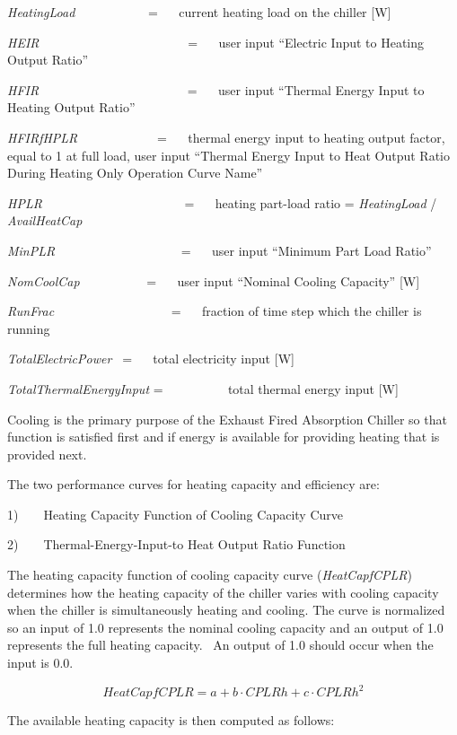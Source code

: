 \emph{HeatingLoad}~~~~~~~~~~~ = ~~ current heating load on the chiller {[}W{]}

\emph{HEIR}~~~~~~~~~~~~~~~~~~~~~~~ = ~~ user input ``Electric Input to Heating Output Ratio''

\emph{HFIR}~~~~~~~~~~~~~~~~~~~~~~~ = ~~ user input ``Thermal Energy Input to Heating Output Ratio''

\emph{HFIRfHPLR}~~~~~~~~~~~~ = ~~ thermal energy input to heating output factor, equal to 1 at full load, user input ``Thermal Energy Input to Heat Output Ratio During Heating Only Operation Curve Name''

\emph{HPLR}~~~~~~~~~~~~~~~~~~~~~~ = ~~ heating part-load ratio = \emph{HeatingLoad} / \emph{AvailHeatCap}

\emph{MinPLR~~~~~~~~~~~~~~~~~~~} = ~~ user input ``Minimum Part Load Ratio''

\emph{NomCoolCap}~~~~~~~~~~ = ~~ user input ``Nominal Cooling Capacity'' {[}W{]}

\emph{RunFrac}~~~~~~~~~~~~~~~~~~ = ~~ fraction of time step which the chiller is running

\emph{TotalElectricPower~} = ~~ total electricity input {[}W{]}

\emph{TotalThermalEnergyInput} = ~~~~~~~~~ total thermal energy input {[}W{]}

Cooling is the primary purpose of the Exhaust Fired Absorption Chiller so that function is satisfied first and if energy is available for providing heating that is provided next.

The two performance curves for heating capacity and efficiency are:

1)~~~~Heating Capacity Function of Cooling Capacity Curve

2)~~~~Thermal-Energy-Input-to Heat Output Ratio Function

The heating capacity function of cooling capacity curve (\emph{HeatCapfCPLR}) determines how the heating capacity of the chiller varies with cooling capacity when the chiller is simultaneously heating and cooling. The curve is normalized so an input of 1.0 represents the nominal cooling capacity and an output of 1.0 represents the full heating capacity.~ An output of 1.0 should occur when the input is 0.0.

\begin{equation}
HeatCapfCPLR = a + b \cdot CPLRh + c \cdot CPLR{h^2}
\end{equation}

The available heating capacity is then computed as follows:

